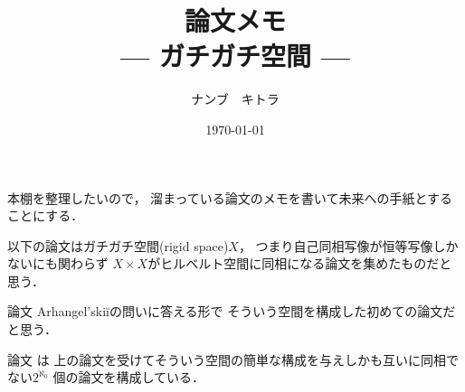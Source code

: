 \documentclass[leqno, a4paper, 12pt]{jsarticle}
\title{論文メモ
\large{\\--- ガチガチ空間 ---}
}
\author{ナンブ　キトラ}
\date{\today}
\begin{document}
\maketitle

本棚を整理したいので，
溜まっている論文のメモを書いて未来への手紙とすることにする．

以下の論文はガチガチ空間(rigid space)$X$，
つまり自己同相写像が恒等写像しかないにも関わらず
$X\times X$がヒルベルト空間に同相になる論文を集めたものだと思う．

論文
\cite{MR0627701}
Arhangel'ski\u{i}の問いに答える形で
そういう空間を構成した初めての論文だと思う．


論文
\cite{MR0766540}
は
上の論文を受けてそういう空間の簡単な構成を与えしかも互いに同相でない$2^{\aleph_{0}}$
個の論文を構成している．

\nocite{*}


\end{document}
